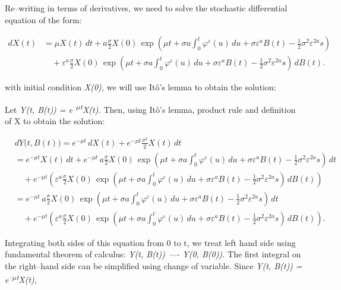 \documentclass[12pt,a4paper]{report}
\numberwithin{equation}{section}
\begin{document}
Re--writing in terms of derivatives, we need to solve the stochastic
differential equation of the form:

\[
\begin{aligned}
dX(t)
&= \mu X(t)\,dt
+ a\frac{\sigma}{2}X(0)\,
\exp\!\left(\mu t+\sigma a\int_{0}^{t}\varphi^{\varepsilon}(u)\,du+\sigma\varepsilon^{a}B(t)-\frac{1}{2}\sigma^{2}\varepsilon^{2a}s\right) \\
&\quad + \varepsilon^{a}\frac{\sigma}{2}X(0)\,
\exp\!\left(\mu t+\sigma a\int_{0}^{t}\varphi^{\varepsilon}(u)\,du+\sigma\varepsilon^{a}B(t)-\frac{1}{2}\sigma^{2}\varepsilon^{2a}s\right)\,dB(t).
\end{aligned}
\]


with initial condition \emph{X(0),} we will use Itô's lemma to obtain
the solution:

Let \emph{Y(t, B(t)) = e\textsuperscript{--$\mu$t}X(t).} Then, using Itô's
lemma, product rule and definition of X to obtain the solution:

\[
\begin{aligned}
&dY\bigl(t,B(t)\bigr)
= e^{-\mu t}\,dX(t) + e^{-\mu t}\frac{\sigma^{2}}{2}X(t)\,dt \\
&= e^{-\mu t}X(t)\,dt
+ e^{-\mu t}\,a\frac{\sigma}{2}X(0)\,
\exp\!\left(\mu t+\sigma a\int_{0}^{t}\varphi^{\varepsilon}(u)\,du+\sigma\varepsilon^{a}B(t)-\frac{1}{2}\sigma^{2}\varepsilon^{2a}s\right)\,dt \\
&\quad + e^{-\mu t}\left(\varepsilon^{a}\frac{\sigma}{2}X(0)\,
\exp\!\left(\mu t+\sigma a\int_{0}^{t}\varphi^{\varepsilon}(u)\,du+\sigma\varepsilon^{a}B(t)-\frac{1}{2}\sigma^{2}\varepsilon^{2a}s\right)\,dB(t)\right) \\
&= e^{-\mu t}\,a\frac{\sigma}{2}X(0)\,
\exp\!\left(\mu t+\sigma a\int_{0}^{t}\varphi^{\varepsilon}(u)\,du+\sigma\varepsilon^{a}B(t)-\frac{1}{2}\sigma^{2}\varepsilon^{2a}s\right)\,dt \\
&\quad + e^{-\mu t}\left(\varepsilon^{a}\frac{\sigma}{2}X(0)\,
\exp\!\left(\mu t+\sigma a\int_{0}^{t}\varphi^{\varepsilon}(u)\,du+\sigma\varepsilon^{a}B(t)-\frac{1}{2}\sigma^{2}\varepsilon^{2a}s\right)\,dB(t)\right).
\end{aligned}
\]



Integrating both sides of this equation from 0 to t, we treat left hand
side using fundamental theorem of calculus: \emph{Y(t, B(t)) ---- Y(0,
B(0)).} The first integral on the right--hand side can be simplified
using change of variable. Since \emph{Y(t, B(t)) =
e\textsuperscript{--$\mu$t}X(t),}
\end{document}
